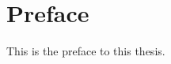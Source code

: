 \chapter*{Preface}
\thispagestyle{empty} %
This is the preface to this thesis.



\newpage\null\thispagestyle{empty} %